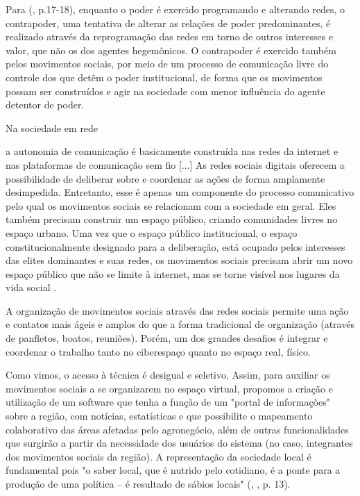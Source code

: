 Para  (\citeyear{castells2013}, p.17-18), enquanto o poder é exercido programando e alterando redes, o contrapoder, uma tentativa de alterar as relações de poder predominantes, é realizado através da reprogramação das redes em torno de outros interesses e valor, que não os dos agentes hegemônicos. O contrapoder é exercido também pelos movimentos sociais, por meio de um processo de comunicação livre do controle dos que detêm o poder institucional, de forma que os movimentos possam ser construídos e agir na sociedade com menor influência do agente detentor de poder. 

Na sociedade em rede

\begin{citacao}
a autonomia de comunicação é basicamente construída nas redes da internet e nas plataformas de comunicação sem fio [...]  As redes sociais digitais oferecem a possibilidade de deliberar sobre e coordenar as ações de forma amplamente desimpedida. Entretanto, esse é apenas um componente do processo comunicativo pelo qual os movimentos sociais se relacionam com a sociedade em geral. Eles também precisam construir um espaço público, criando comunidades livres no espaço urbano. Uma vez que o espaço público institucional, o espaço constitucionalmente designado para a deliberação, está ocupado pelos interesses das elites dominantes e suas redes, os movimentos sociais precisam abrir um novo espaço público que não se limite à internet, mas se torne visível nos lugares da vida social \cite[p .18-19]{castells2013}.
\end{citacao}

A organização de movimentos sociais através das redes sociais permite uma ação e contatos mais ágeis e amplos do que a forma tradicional de organização (através de panfletos, boatos, reuniões). Porém, um dos grandes desafios é integrar e coordenar o trabalho tanto no ciberespaço quanto no espaço real, físico.

Como vimos, o acesso à técnica é desigual e seletivo. Assim, para auxiliar os movimentos sociais a se organizarem no espaço virtual, propomos a criação e utilização de um software que tenha a função de um "portal de informações" sobre a região, com notícias, estatísticas e que possibilite o mapeamento colaborativo das áreas afetadas pelo agronegócio, além de outras funcionalidades que surgirão a partir da necessidade dos usuários do sistema (no caso, integrantes dos movimentos sociais da região). A representação da sociedade local é fundamental pois "o saber local, que é nutrido pelo cotidiano, é a ponte para a produção de uma política – é resultado de sábios locais" (\citeauthor{santos1999}, \citeyear{santos1999}, p. 13). 

